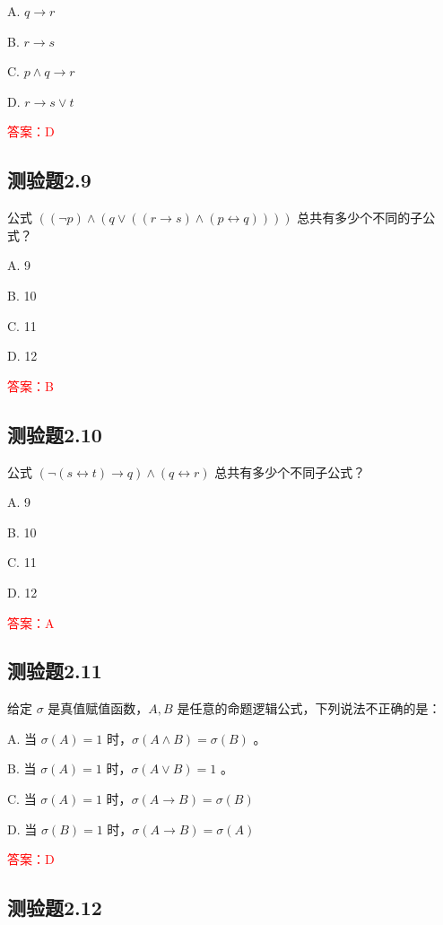 \documentclass[UTF8, heading=true]{ctexart}
\begin{document}
A. $q \rightarrow r$

B. $r \rightarrow s$

C. $p \wedge q \rightarrow r$

D. $r \rightarrow s \vee t$

\textcolor{red}{答案：D}


\subsection{测验题2.9}

公式 $((\neg p) \wedge(q \vee((r \rightarrow s) \wedge(p \leftrightarrow q))))$ 总共有多少个不同的子公式？

A. 9

B. 10

C. 11

D. 12

\textcolor{red}{答案：B}

\subsection{测验题2.10}

公式 $(\neg(s \leftrightarrow t) \rightarrow q) \wedge(q \leftrightarrow r)$ 总共有多少个不同子公式？

A. 9

B. 10

C. 11

D. 12

\textcolor{red}{答案：A}

\subsection{测验题2.11}

给定 $\sigma$ 是真值赋值函数，$A, B$ 是任意的命题逻辑公式，下列说法不正确的是：

A. 当 $\sigma(A)=1$ 时，$\sigma(A \wedge B)=\sigma(B)$ 。

B. 当 $\sigma(A)=1$ 时，$\sigma(A \vee B)=1$ 。

C. 当 $\sigma(A)=1$ 时，$\sigma(A \rightarrow B)=\sigma(B)$

D. 当 $\sigma(B)=1$ 时，$\sigma(A \rightarrow B)=\sigma(A)$

\textcolor{red}{答案：D}

\subsection{测验题2.12}
\end{document}
